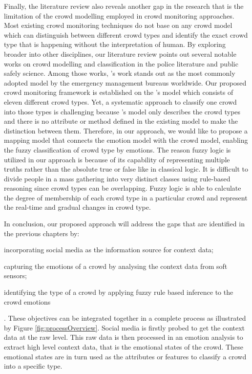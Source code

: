 Finally, the literature review also reveals another gap in the research that is the limitation of the crowd modelling employed in crowd monitoring approaches. Most existing crowd monitoring techniques do not base on any crowd model which can distinguish between different crowd types and identify the exact crowd type that is happening without the interpretation of human. By exploring broader into other disciplines, our literature review points out several notable works on crowd modelling and classification in the police literature and public safely science. Among those works, \citet{Berlonghi1995}'s work stands out as the most commonly adopted model by the emergency management bureaus worldwide. Our proposed crowd monitoring framework is established on the \citet{Berlonghi1995}'s model which consists of eleven different crowd types. Yet, a systematic approach to classify one crowd into those types is challenging because \citet{Berlonghi1995}'s model only describes the crowd types and there is no attribute or method defined in the existing model to make the distinction between them. Therefore, in our approach, we would like to propose a mapping model that connects the emotion model with the crowd model, enabling the fuzzy classification of crowd type by emotions. The reason fuzzy logic is utilized in our approach is because of its capability of representing multiple truths rather than the absolute true or false like in classical logic. It is difficult to divide people in a mass gathering into very distinct classes using rule-based reasoning since crowd types can be overlapping. Fuzzy logic is able to calculate the degree of membership of each crowd type in a particular crowd and represent the real-time and gradual changes in crowd type.

In conclusion, our proposed approach will address the gaps that are identified in the previous chapters by: 
\begin{inparaenum}[i)]
\item incorporating social media as the information source for context data;
\item capturing the emotions of a crowd by analysing the context data from soft sensors;
\item identifying the type of a crowd by applying fuzzy rule based inference to the crowd emotions
\end{inparaenum}. These objectives can be integrated together in a complete process as illustrated by Figure \ref{fig:processOverview}. Social media is firstly probed to get the context data at the raw level. This raw data is then processed in an emotion analysis to extract high level context data, that is the emotional states of the crowd. These emotional states are in turn used as the attributes or features to classify a crowd into a specific type.


